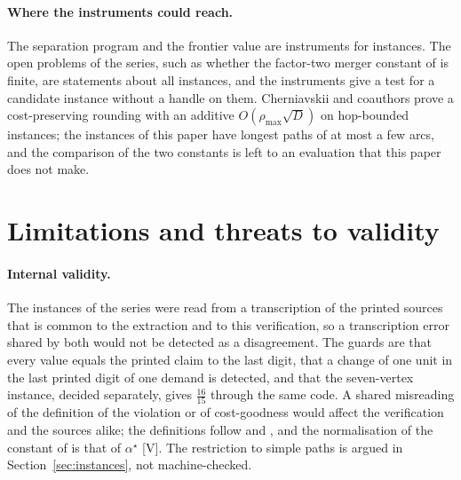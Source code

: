 \documentclass[11pt]{article}
\theoremstyle{remark}
\begin{document}
\paragraph{Where the instruments could reach.} The separation program and the frontier value are instruments for instances. The open problems of the series, such as whether the factor-two merger constant of \cite{Nik3} is finite, are statements about all instances, and the instruments give a test for a candidate instance without a handle on them. Cherniavskii and coauthors \cite{CKMS26} prove a cost-preserving rounding with an additive $O(\rho_{\max}\sqrt D)$ on hop-bounded instances; the instances of this paper have longest paths of at most a few arcs, and the comparison of the two constants is left to an evaluation that this paper does not make.

\section{Limitations and threats to validity}
\label{sec:limits}

\paragraph{Internal validity.} The instances of the series were read from a transcription of the printed sources that is common to the extraction and to this verification, so a transcription error shared by both would not be detected as a disagreement. The guards are that every value equals the printed claim to the last digit, that a change of one unit in the last printed digit of one demand is detected, and that the seven-vertex instance, decided separately,
gives $\tfrac{16}{15}$ through the same code. A shared misreading of the definition of the violation or of cost-goodness would affect the verification and the sources alike; the definitions follow \cite{TVZ24} and \cite{STVZ25}, and the normalisation of the constant of \cite{Nik1,Nik2,Nik3} is that of $\alpha^\star$ [V].
The restriction to simple paths is argued in Section~\ref{sec:instances}, not machine-checked.
\end{document}
